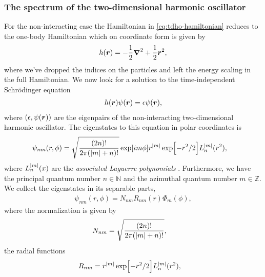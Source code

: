         \subsubsection{The spectrum of the two-dimensional harmonic oscillator}
            For the non-interacting case the Hamiltonian in
            \autoref{eq:tdho-hamiltonian} reduces to the one-body Hamiltonian
            which on coordinate form is given by
            \begin{align}
                h(\boldsymbol{r})
                = -\frac{1}{2}\boldsymbol{\nabla}^2 + \frac{1}{2}\boldsymbol{r}^2,
                \label{eq:tdho-one-body-hamiltonian}
            \end{align}
            where we've dropped the indices on the particles and left the energy
            scaling in the full Hamiltonian.
            We now look for a solution to the time-independent Schrödinger equation
            \begin{align}
                h(\boldsymbol{r})\psi(\boldsymbol{r}) = \epsilon \psi(\boldsymbol{r}),
            \end{align}
            where $(\epsilon, \psi(\boldsymbol{r}))$ are the eigenpairs of the
            non-interacting two-dimensional harmonic oscillator.
            The eigenstates to this equation in polar coordinates is
            \begin{align}
                \psi_{nm}(r, \phi)
                &= \sqrt{\frac{(2n)!}{2\pi(\abs{m} + n)!}}
                \exp[i m \phi]
                r^{\abs{m}}
                \exp[-r^2 / 2]
                L^{\abs{m}}_{n}(r^2),
                \label{eq:eigenstate-tdho}
            \end{align}
            where $L^{\abs{m}}_{n}(x)$ are the \emph{associated Laguerre
            polynomials} \cite{anisimovas1998energy}.
            Furthermore, we have the principal quantum number $n \in \mathbb{N}$
            and the azimuthal quantum number $m \in \mathbb{Z}$.
            We collect the eigenstates in its separable parts,
            \begin{align}
                \psi_{nm}(r, \phi)
                = N_{nm} R_{nm}(r) \Phi_{m}(\phi),
            \end{align}
            where the normalization is given by
            \begin{align}
                N_{nm}
                &= \sqrt{\frac{(2n)!}{2\pi(\abs{m} + n)!}},
            \end{align}
            the radial functions
            \begin{align}
                R_{nm}
                &=
                r^{\abs{m}}
                \exp[-r^2 / 2]
                L^{\abs{m}}_{n}(r^2),
                \label{eq:radial-function-tdho}
            \end{align}
